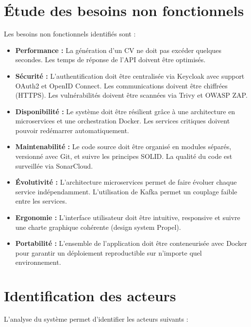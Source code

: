 \section{Étude des besoins non fonctionnels}
\label{sec:analyse:non-fonctionnels}

Les besoins non fonctionnels identifiés sont :

\begin{itemize}
    \item \textbf{Performance :} La génération d'un CV ne doit pas excéder quelques secondes. Les temps de réponse de l'API doivent être optimisés.
    \item \textbf{Sécurité :} L'authentification doit être centralisée via Keycloak avec support OAuth2 et OpenID Connect. Les communications doivent être chiffrées (HTTPS). Les vulnérabilités doivent être scannées via Trivy et OWASP ZAP.
    \item \textbf{Disponibilité :} Le système doit être résilient grâce à une architecture en microservices et une orchestration Docker. Les services critiques doivent pouvoir redémarrer automatiquement.
    \item \textbf{Maintenabilité :} Le code source doit être organisé en modules séparés, versionné avec Git, et suivre les principes SOLID. La qualité du code est surveillée via SonarCloud.
    \item \textbf{Évolutivité :} L'architecture microservices permet de faire évoluer chaque service indépendamment. L'utilisation de Kafka permet un couplage faible entre les services.
    \item \textbf{Ergonomie :} L'interface utilisateur doit être intuitive, responsive et suivre une charte graphique cohérente (design system Propel).
    \item \textbf{Portabilité :} L'ensemble de l'application doit être conteneurisée avec Docker pour garantir un déploiement reproductible sur n'importe quel environnement.
\end{itemize}

\section{Identification des acteurs}
\label{sec:analyse:acteurs}

L'analyse du système \projectname{} permet d'identifier les acteurs suivants :

